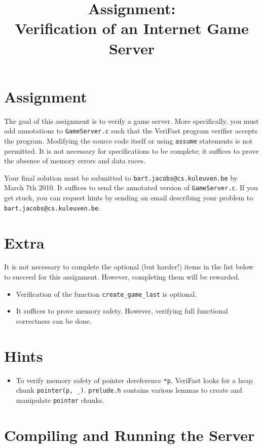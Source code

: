 \documentclass{article}
\title{Assignment:\\
Verification of an Internet Game Server}
\begin{document}
\maketitle

\section{Assignment}
The goal of this assignment is to verify a game server. More specifically, you must add annotations to \texttt{GameServer.c} such that the VeriFast program verifier accepts the program. Modifying the source code itself or using \texttt{assume} statements is not permitted. It is not necessary for specifications to be complete; it suffices to prove the absence of memory errors and data races.

Your final solution must be submitted to \texttt{bart.jacobs@cs.kuleuven.be} by March 7th 2010. It suffices to send the annotated version of \texttt{GameServer.c}. If you get stuck, you can request hints by sending an email describing your problem to \texttt{bart.jacobs@cs.kuleuven.be}.

\section{Extra}
It is not necessary to complete the optional (but harder!) items in the list below to succeed for this assignment. However, completing them will be rewarded.

\begin{itemize}
  \item Verification of the function \texttt{create\_game\_last} is optional.
  \item It suffices to prove memory safety. However, verifying full functional correctness can be done.
\end{itemize}

\section{Hints}

\begin{itemize}
  \item To verify memory safety of pointer dereference \texttt{*p}, VeriFast looks for a heap chunk \texttt{pointer(p, \_)}. \texttt{prelude.h} contains various lemmas to create and manipulate \texttt{pointer} chunks.
\end{itemize}

\section{Compiling and Running the Server}
\end{document}
